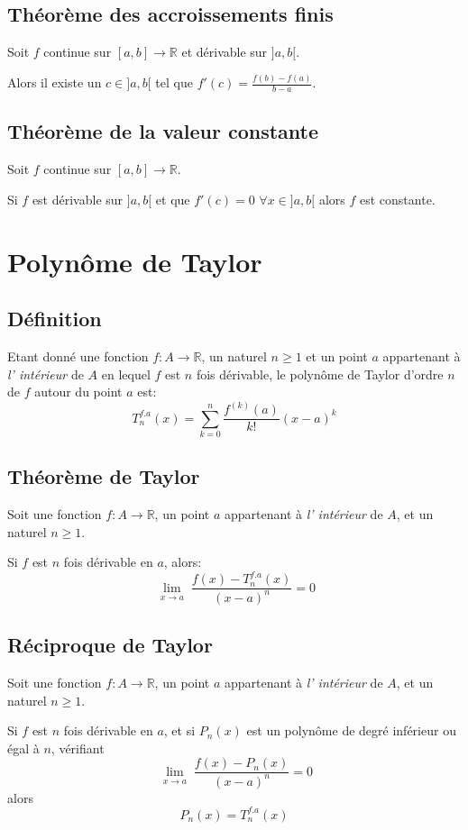 \subsection{Théorème des accroissements finis}
Soit $f$ continue sur $ [a,b] \rightarrow \mathbb{R}$ et dérivable sur $]a,b[$.

Alors il existe un $c \in ]a,b[$ tel que $f'(c) = \frac{f(b) - f(a)}{b - a}$.

\subsection{Théorème de la valeur constante}
Soit $f$ continue sur $ [a,b] \rightarrow \mathbb{R}$.

Si $f$ est dérivable sur $]a,b[$ et que
$f'(c) = 0$ $\forall x \in ]a,b[$ alors $f$ est constante.

\section{Polynôme de Taylor}
\subsection{Définition}
Etant donné une fonction $f : A \rightarrow \mathbb{R}$,
un naturel $n \geq 1$ et un point $a$ appartenant à \emph{l' intérieur}
de $A$ en lequel $f$ est $n$ fois dérivable,
le polynôme de Taylor d'ordre $n$ de $f$ autour du point $a$ est:
\[ T_n^{f.a}(x) = \sum_{k = 0}^n \frac{f^{(k)}(a)}{k!}(x - a)^k \]

\subsection{Théorème de Taylor}
Soit une fonction $f : A \rightarrow \mathbb{R}$,
un point $a$ appartenant à \emph{l' intérieur} de $A$,
et un naturel $n \geq 1$.

Si $f$ est $n$ fois dérivable en $a$, alors:
\[ \lim_{\substack{x \rightarrow a}}
\frac{f(x) - T_n^{f.a}(x)}{(x - a)^n} = 0 \]

\subsection{Réciproque de Taylor}
Soit une fonction $f : A \rightarrow \mathbb{R}$, un point $a$ appartenant
à \emph{l' intérieur} de $A$, et un naturel $n \geq 1$.

Si $f$ est $n$ fois dérivable en $a$, et si
$P_n(x)$ est un polynôme de degré inférieur ou égal à $n$, vérifiant
\[ \lim_{\substack{x \rightarrow a}} \frac{f(x) - P_n(x)}{(x - a)^n} = 0 \]
alors
\[ P_n(x) = T_n^{f.a}(x) \]

